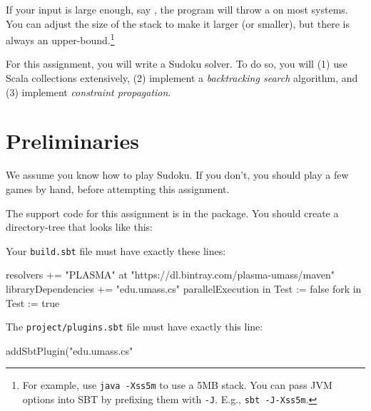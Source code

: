 \documentclass{book}
\begin{document}
If your input is large enough, say , the program
will throw a  on most systems.
You can adjust the size of the stack to make it larger (or smaller), but there
is always an upper-bound.\footnote{For example, use \texttt{java -Xss5m} to
use a 5MB stack. You can pass JVM options into SBT by prefixing them with \texttt{-J}. E.g., \texttt{sbt -J-Xss5m}.}



\newlecture

\newlecture


\newlecture

\newlecture



For this assignment, you will write a Sudoku solver. To do so, you will
(1) use Scala collections extensively, (2) implement a \emph{backtracking
search} algorithm, and (3) implement \emph{constraint propagation}.


\section{Preliminaries}

We assume you know how to play Sudoku. If you don't, you should play a few
games by hand, before attempting this assignment.

The support code for this assignment is in the 
package. You should create a directory-tree that looks like this:


Your \texttt{build.sbt} file must have exactly these lines:

\begin{scalacode}
resolvers += "PLASMA" at "https://dl.bintray.com/plasma-umass/maven"
libraryDependencies += "edu.umass.cs" %
parallelExecution in Test := false
fork in Test := true
\end{scalacode}

The \texttt{project/plugins.sbt} file must have exactly this line:

\begin{scalacode}
addSbtPlugin("edu.umass.cs" %
\end{scalacode}
\end{document}
